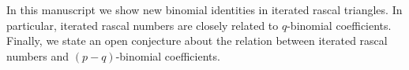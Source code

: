 In this manuscript we show new binomial identities in iterated rascal triangles.
In particular, iterated rascal numbers are closely related to $q$-binomial coefficients.
Finally, we state an open conjecture about the relation between iterated rascal numbers and
$(p-q)$-binomial coefficients.

